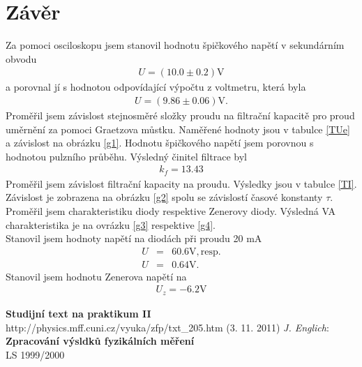 \documentclass[a4paper,12pt]{article}
\begin{document}
\section{Závěr}
\noindent
Za pomoci osciloskopu jsem stanovil hodnotu špičkového napětí v sekundárním obvodu
\begin{eqnarray}
U=(10.0\pm0.2)\mbox{V}
\end{eqnarray}
a porovnal jí s hodnotou odpovídající výpočtu z voltmetru, která byla
\begin{eqnarray}
U=(9.86\pm0.06)\mbox{V}.
\end{eqnarray}
Proměřil jsem závislost stejnosměré složky proudu na filtrační kapacitě pro proud uměrnění za 
pomoci Graetzova můstku. Naměřené hodnoty jsou v tabulce \ref{TUe} a závislost na obrázku 
\ref{g1}. Hodnotu špičkového napětí jsem porovnou s hodnotou pulzního průběhu. Výsledný činitel 
filtrace byl
\begin{eqnarray}
k_f=13.43
\end{eqnarray}
Proměřil jsem závislost filtrační kapacity na proudu. Výsledky jsou v tabulce \ref{TI}. Závislost 
je zobrazena na obrázku \ref{g2} spolu se závislostí časové konstanty $\tau$. \\
Proměřil jsem charakteristiku diody respektive Zenerovy diody. Výsledná VA charakteristika je 
na ovrázku \ref{g3} respektive \ref{g4}.\\
Stanovil jsem hodnoty napětí na diodách při proudu 20 mA
\begin{eqnarray}
U&=&60.6 \mbox{V} ,\mbox{resp.} \\
U&=&0.64 \mbox{V}.
\end{eqnarray}
Stanovil jsem hodnotu Zenerova napětí na
\begin{eqnarray}
U_z=-6.2\mbox{V}
\end{eqnarray}

\begin{thebibliography}{5}
	 \textbf{Studijní text na praktikum II} \\http://physics.mff.cuni.cz/vyuka/zfp/txt\_205.htm (3. 11. 2011)
     \emph{J. Englich}: \textbf{Zpracování výsldků fyzikálních měření} \\ LS 1999/2000
\end{thebibliography}
\end{document}
